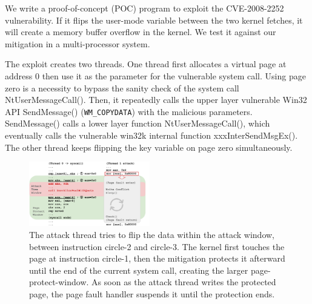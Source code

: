 We write a proof-of-concept (POC) program to exploit the CVE-2008-2252 vulnerability. If it flips the user-mode variable between the two kernel fetches, it will create a memory buffer overflow in the kernel. We test it against our mitigation in a multi-processor system.



The exploit creates two threads. One thread first allocates a virtual page at address 0 then use it as the parameter for the vulnerable system call. Using page zero is a necessity to bypass the sanity check of the system call NtUserMessageCall(). Then, it repeatedly calls the upper layer vulnerable Win32 API SendMessage() (\texttt{WM\_COPYDATA}) with the malicious parameters. SendMessage() calls a lower layer function NtUserMessageCall(), which eventually calls the vulnerable win32k internal function xxxInterSendMsgEx(). The other thread keeps flipping the key variable on page zero simultaneously.

\begin{figure}[th]
  \includegraphics[width=0.47\textwidth]{figures/ms08061case2}
  \centering
  \caption{The attack thread tries to flip the data within the attack window, between instruction circle-2 and circle-3. The kernel first touches the page at instruction circle-1, then the mitigation protects it afterward until the end of the current system call, creating the larger page-protect-window. As soon as the attack thread writes the protected page, the page fault handler suspends it until the protection ends.}
  \label{fig:ms08061case}
\end{figure}


